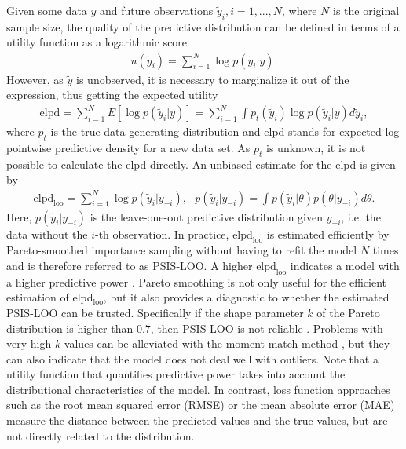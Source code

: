Given some data $y$ and future observations $\tilde y_i, i = 1, ..., N$, where $N$ is the original sample size, the quality of the predictive distribution can be defined in terms of a utility function as a logarithmic score \citep{piironen_comparison_2017}
\begin{gather*}
    u(\tilde y_i) = \displaystyle \sum_{i = 1}^N\log p(\tilde y_i|y).
\end{gather*}
However, as $\tilde y$ is unobserved, it is necessary to marginalize it out of the expression, thus getting the expected utility
\begin{gather*}
    \text{elpd} =
    \displaystyle \sum_{i = 1}^N E[\log p(\tilde y_i| y)] =
    \displaystyle \sum_{i = 1}^N \int p_t(\tilde y_i) \log p(\tilde y_i| y) d \tilde y_i,
\end{gather*}
where $p_t$ is the true data generating distribution and elpd stands for expected log pointwise predictive density for a new data set.
As $p_t$ is unknown, it is not possible to calculate the elpd directly.
An unbiased estimate for the elpd is given by
\begin{gather}
    \text{elpd}_{\text{loo}} =
    \displaystyle \sum_{i = 1}^N \log p(\tilde y_i| y_{-i}),
    ~~~ p(\tilde y_i| y_{-i}) = \displaystyle \int p(\tilde y_i | \theta)p(\theta|y_{-i})d\theta.
\end{gather}
Here, $p(\tilde y_i| y_{-i})$ is the leave-one-out predictive distribution given $y_{-i}$, i.e. the data without the $i$-th observation.
In practice, $\text{elpd}_{\text{loo}}$ is estimated efficiently by Pareto-smoothed importance sampling without having to refit the model $N$ times and is therefore referred to as PSIS-LOO.
A higher $\text{elpd}_{\text{loo}}$ indicates a model with a higher predictive power \citep{vehtari_practical_2017}.
Pareto smoothing is not only useful for the efficient estimation of elpd$_{\text{loo}}$, but it also provides a diagnostic to whether the estimated PSIS-LOO can be trusted.
Specifically if the shape parameter $k$ of the Pareto distribution is higher than 0.7, then PSIS-LOO is not reliable \citep{vehtari_practical_2017}.
Problems with very high $k$ values can be alleviated with the moment match method \cite{paananen_implicitly_2021}, but they can also indicate that the model does not deal well with outliers.
Note that a utility function that quantifies predictive power takes into account the distributional characteristics of the model.
In contrast, loss function approaches such as the root mean squared error (RMSE) or the mean absolute error (MAE) measure the distance between the predicted values and the true values, but are not directly related to the distribution.

